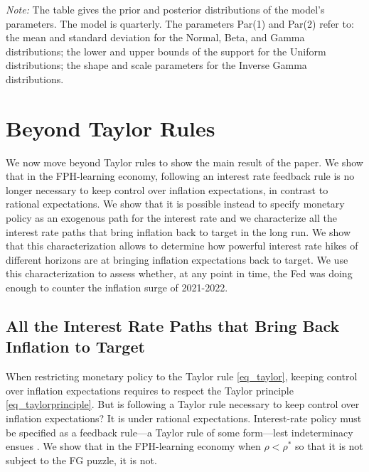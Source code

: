 \documentclass{article}
\begin{document}
\begin{table}
\begin{center}
\begin{tabularx}{0.8\textwidth}{llccccc}
\hline 
\end{tabularx}
		\begin{minipage}[c]{6.0in}
			\footnotesize \baselineskip=11pt \vspace{5pt} 
			\emph{Note:} The table gives the prior and posterior distributions of the model's parameters. The model is quarterly. The parameters Par(1) and Par(2) refer to: the mean and standard deviation for the Normal, Beta, and Gamma distributions; the lower and upper bounds of the support for the Uniform distributions; the shape and scale parameters for the Inverse Gamma distributions.
		\end{minipage}	
	\end{center}
	\label{table_estimation}
\end{table}

\section{Beyond Taylor Rules}\label{sec_beyondtaylor}
We now move beyond Taylor rules to show the main result of the paper. We show that in the FPH-learning economy, following an interest rate feedback rule is no longer necessary to keep control over inflation expectations, in contrast to rational expectations. We show that it is possible instead to specify monetary policy as an exogenous path for the interest rate and we characterize all the interest rate paths that bring inflation back to target in the long run. We show that this characterization allows to determine how powerful interest rate hikes of different horizons are at bringing inflation expectations back to target. We use this characterization to assess whether, at any point in time, the Fed was doing enough to counter the inflation surge of 2021-2022.

\subsection{All the Interest Rate Paths that Bring Back Inflation to Target}
When restricting monetary policy to the Taylor rule \eqref{eq_taylor}, keeping control over inflation expectations requires to respect the Taylor principle \eqref{eq_taylorprinciple}. But is following a Taylor rule necessary to keep control over inflation expectations? It is under rational expectations. Interest-rate policy must be specified as a feedback rule---a Taylor rule of some form---lest indeterminacy ensues \citep{McCallum1981}. We show that in the FPH-learning economy when $\rho<\rho^*$ so that it is not subject to the FG puzzle, it is not.
\end{document}
